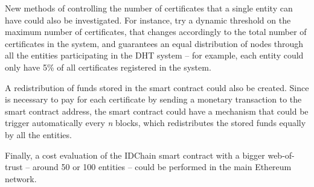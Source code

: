 New methods of controlling the number of certificates that a single entity can have could also be investigated.
For instance, try a dynamic threshold on the maximum number of certificates, that changes accordingly to the total number of certificates in the system, and guarantees an equal distribution of nodes through all the entities participating in the DHT system – for example, each entity could only have 5\% of all certificates registered in the system.

A redistribution of funds stored in the smart contract could also be created.
Since is necessary to pay for each certificate by sending a monetary transaction to the smart contract address, the smart contract could have a mechanism that could be trigger automatically every \textit{n} blocks, which redistributes the stored funds equally by all the entities.

Finally, a cost evaluation of the IDChain smart contract with a bigger web-of-trust – around 50 or 100 entities – could be performed in the main Ethereum network.

\cleardoublepage
